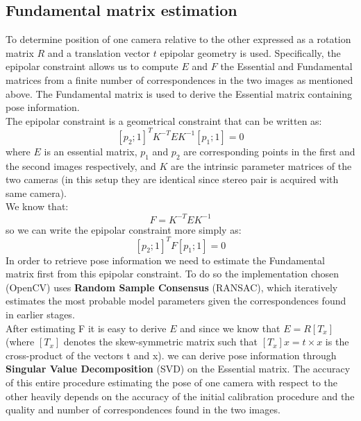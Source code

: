 \documentclass[12pt]{amsart}
\begin{document}
\subsection{Fundamental matrix estimation}
To determine position of one camera relative to the other expressed as a rotation matrix \(R\) and a translation vector \(t\) epipolar geometry is used.
Specifically, the epipolar constraint allows us to compute \(E\) and \(F\) the Essential and Fundamental matrices from a finite number of correspondences in the two images as mentioned above.
The Fundamental matrix is used to derive the Essential matrix containing pose information.\\
The epipolar constraint is a geometrical constraint that can be written as:
\[[p_2; 1]^T K^{-T} E K^{-1} [p_1; 1] = 0\]
where \(E\) is an essential matrix, \(p_1\) and \(p_2\) are corresponding points in the first and the second images respectively,
and \(K\) are the intrinsic parameter matrices of the two cameras (in this setup they are identical since stereo pair is acquired with same camera).
\\
We know that: 
\[F = K^{-T} E K^{-1}\]
so we can write the epipolar constraint more simply as:
\[[p_2; 1]^T F [p_1; 1] = 0\]
In order to retrieve pose information we need to estimate the Fundamental matrix first from this epipolar constraint. 
To do so the implementation chosen (OpenCV) uses \textbf{Random Sample Consensus} (RANSAC), which iteratively estimates the most probable model parameters given the correspondences
found in earlier stages.\\
After estimating F it is easy to derive \(E\) and since we know that \(E = R[T_x]\) (where \([T_x]\) denotes the skew-symmetric matrix such that \([T_x]x = t \times x \) is the cross-product of the vectors t and x).
we can derive pose information through \textbf{Singular Value Decomposition} (SVD) on the Essential matrix.
The accuracy of this entire procedure estimating the pose of one camera with respect to the other heavily depends on the accuracy of the initial calibration procedure and
the quality and number of correspondences found in the two images.
\end{document}

